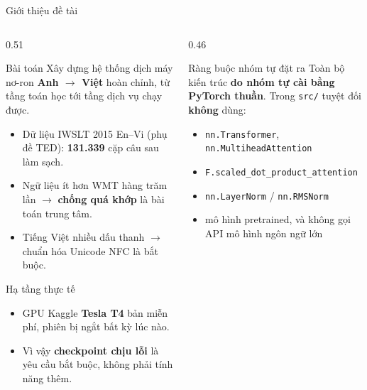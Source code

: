 \documentclass[aspectratio=169, 10pt]{beamer}
\begin{document}
\begin{frame}[shrink=10]{Giới thiệu đề tài}
  \begin{columns}[T]
    \begin{column}{0.51\textwidth}
      \begin{block}{Bài toán}
        Xây dựng hệ thống dịch máy nơ-ron \textbf{Anh $\rightarrow$ Việt} hoàn chỉnh,
        từ tầng toán học tới tầng dịch vụ chạy được.
        \begin{itemize}
          \setlength{\itemsep}{0.2em}
          \item Dữ liệu IWSLT 2015 En--Vi (phụ đề TED): \textbf{131.339} cặp câu sau làm sạch.
          \item Ngữ liệu ít hơn WMT hàng trăm lần $\rightarrow$ \textbf{chống quá khớp}
            là bài toán trung tâm.
          \item Tiếng Việt nhiều dấu thanh $\rightarrow$ chuẩn hóa Unicode NFC là bắt buộc.
        \end{itemize}
      \end{block}
      \begin{block}{Hạ tầng thực tế}
        \begin{itemize}
          \setlength{\itemsep}{0.2em}
          \item GPU Kaggle \textbf{Tesla T4} bản miễn phí, phiên bị ngắt bất kỳ lúc nào.
          \item Vì vậy \textbf{checkpoint chịu lỗi} là yêu cầu bắt buộc, không phải
            tính năng thêm.
        \end{itemize}
      \end{block}
    \end{column}
    \begin{column}{0.46\textwidth}
      \begin{block}{Ràng buộc nhóm tự đặt ra}
        Toàn bộ kiến trúc \textbf{do nhóm tự cài bằng PyTorch thuần}.
        Trong \texttt{src/} tuyệt đối \textbf{không} dùng:
        \begin{itemize}
          \setlength{\itemsep}{0.15em}
          \item \texttt{nn.Transformer}, \texttt{nn.MultiheadAttention}
          \item \texttt{F.scaled\_dot\_product\_attention}
          \item \texttt{nn.LayerNorm} / \texttt{nn.RMSNorm}
          \item mô hình pretrained, và không gọi API mô hình ngôn ngữ lớn

\end{itemize}
\end{block}
\end{column}
\end{columns}
\end{frame}
\end{document}
